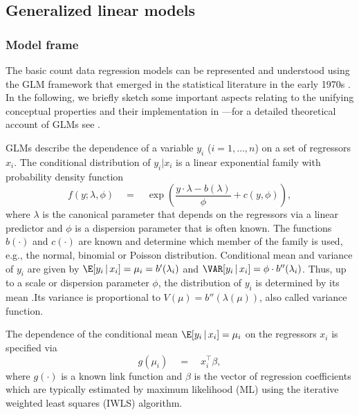 \documentclass{Z}
\begin{document}
\subsection{Generalized linear models}

\subsubsection{Model frame}

The basic count data regression models can
be represented and understood using the GLM
framework that emerged in the statistical literature in the early 1970s
\citep{countreg:Nelder+Wedderburn:1972}. In the following, we briefly
sketch some important aspects relating to the unifying conceptual properties
and their implementation in ---for a detailed theoretical account of GLMs
see \cite{countreg:McCullagh+Nelder:1989}.

GLMs describe the dependence of a variable $y_i$ ($i = 1, \dots, n$)
on a set of regressors $x_i$. The conditional distribution of
$y_i | x_i$ is a linear exponential family with probability density function
\begin{equation} \label{eq:family}
f(y; \lambda, \phi) \quad = \quad
                              \exp \left( \frac{y \cdot \lambda - b(\lambda)}{\phi} +
                              c(y, \phi) \right),
\end{equation}
where $\lambda$ is the canonical parameter that depends on the regressors via
a linear predictor and $\phi$ is a dispersion parameter that is often known.
The functions $b(\cdot)$ and $c(\cdot)$ are known and determine which member
of the family is used, e.g., the normal, binomial or Poisson distribution.
Conditional mean and variance of $y_i$ are given by
$\E[y_i \, | \, x_i] = \mu_i = b'(\lambda_i)$ and
$\VAR[y_i \, | \, x_i] = \phi \cdot b''(\lambda_i)$. Thus, up to a scale
or dispersion parameter $\phi$, the distribution of $y_i$ is determined by
its mean .Its variance is proportional to $V(\mu) = b''(\lambda(\mu))$,
also called variance function.

The dependence of the conditional mean $\E[y_i \, | \, x_i] = \mu_i$
on the regressors $x_i$ is specified via
\begin{equation} \label{eq:mean}
g(\mu_i) \quad = \quad x_i^\top \beta,
\end{equation}
where $g(\cdot)$ is a known link function and $\beta$ is the vector of regression
coefficients which are typically estimated by maximum likelihood (ML)
using the iterative weighted least squares (IWLS) algorithm.
\end{document}
